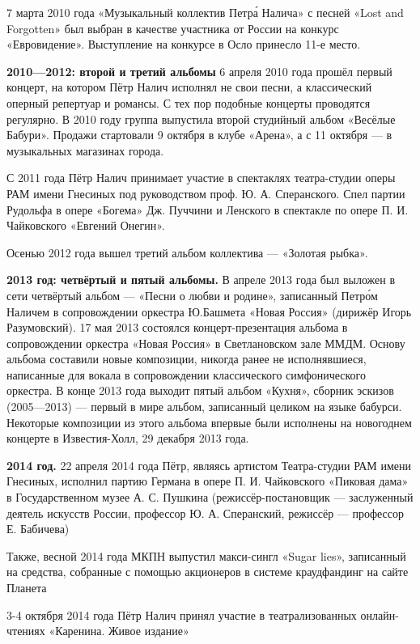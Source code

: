 7 марта 2010 года «Музыкальный коллектив Петр\'{а} Налича» с песней «Lost and Forgotten» был выбран в качестве участника от России на конкурс «Евровидение». Выступление на конкурсе в Осло принесло 11-е место.

\textbf{2010---2012: второй и третий альбомы}
6 апреля 2010 года прошёл первый концерт, на котором Пётр Налич исполнял не свои песни, а классический оперный репертуар и романсы. С тех пор подобные концерты проводятся регулярно. В 2010 году группа выпустила второй студийный альбом «Весёлые Бабури». Продажи стартовали 9 октября в клубе «Арена», а с 11 октября --- в музыкальных магазинах города.

С 2011 года Пётр Налич принимает участие в спектаклях театра-студии оперы РАМ имени Гнесиных под руководством проф. Ю. А. Сперанского. Спел партии Рудольфа в опере «Богема» Дж. Пуччини и Ленского в спектакле по опере П. И. Чайковского «Евгений Онегин».

Осенью 2012 года вышел третий альбом коллектива --- «Золотая рыбка».


\textbf{2013 год: четвёртый и пятый альбомы.}
В апреле 2013 года был выложен в сети четвёртый альбом --- «Песни о любви и родине», записанный Петр\'{о}м Наличем в сопровождении оркестра Ю.Башмета «Новая Россия» (дирижёр Игорь Разумовский). 17 мая 2013 состоялся концерт-презентация альбома в сопровождении оркестра «Новая Россия» в Светлановском зале ММДМ. Основу альбома составили новые композиции, никогда ранее не исполнявшиеся, написанные для вокала в сопровождении классического симфонического оркестра. В конце 2013 года выходит пятый альбом «Кухня», сборник эскизов (2005---2013) --- первый в мире альбом, записанный целиком на языке бабурси. Некоторые композиции из этого альбома впервые были исполнены на новогоднем концерте в Известия-Холл, 29 декабря 2013 года.

\textbf{2014 год.}
22 апреля 2014 года Пётр, являясь артистом Театра-студии РАМ имени Гнесиных, исполнил партию Германа в опере П. И. Чайковского «Пиковая дама» в Государственном музее А. С. Пушкина (режиссёр-постановщик --- заслуженный деятель искусств России, профессор Ю. А. Сперанский, режиссёр --- профессор Е. Бабичева)

Также, весной 2014 года МКПН выпустил макси-сингл «Sugar lies», записанный на средства, собранные с помощью акционеров в системе краудфандинг на сайте Планета

3-4 октября 2014 года Пётр Налич принял участие в театрализованных онлайн-чтениях «Каренина. Живое издание»


